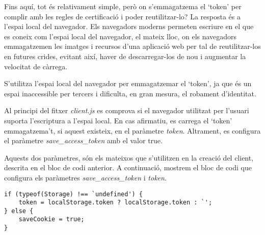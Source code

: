 Fins aquí, tot és relativament simple, però on s'emmagatzema el `token' per complir amb les regles de certificació i poder reutilitzar-lo? La resposta és a l'espai local del navegador. Els navegadors moderns permeten escriure en el que es coneix com l'espai local del navegador, el mateix lloc, on els navegadors emmagatzemen les imatges i recursos d'una aplicació web per tal de reutilitzar-los en futures crides, evitant així, haver de descarregar-los de nou i augmentar la velocitat de càrrega.

S'utilitza l'espai local del navegador per emmagatzemar el `token', ja que és un espai inaccessible per tercers i dificulta, en gran mesura, el robament d'identitat.

Al principi del fitxer \emph{client.js} es comprova si el navegador utilitzat per l'usuari suporta l'escriptura a l'espai local. En cas afirmatiu, es carrega el `token' emmagatzema't, si aquest existeix, en el paràmetre \emph{token}. Altrament, es configura el paràmetre \emph{save\_access\_token} amb el valor true.

Aquests dos paràmetres, són els mateixos que s'utilitzen en la creació del client, descrita en el bloc de codi anterior. A continuació, mostrem el bloc de codi que configura els paràmetres \emph{save\_access\_token} i \emph{token}.

\begin{lstlisting}[style=rawOwn,caption={Configuració dels paràmetres \emph{access\_test\_token} i \emph{token}}]
if (typeof(Storage) !== `undefined') {
    token = localStorage.token ? localStorage.token : `';
} else {
    saveCookie = true;
}
\end{lstlisting}
